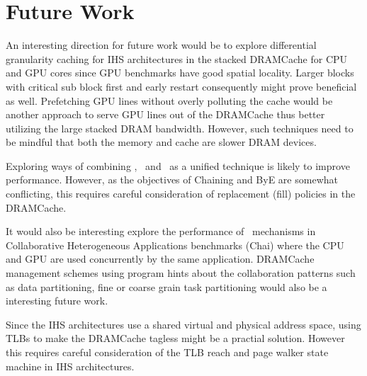 \section{Future Work}
An interesting direction for future work would be to explore differential granularity caching for IHS architectures in the stacked DRAMCache for CPU and GPU cores since GPU benchmarks have good spatial locality. Larger blocks with critical sub block first and early restart \cite{dram-book} consequently might prove beneficial as well. Prefetching GPU lines without overly polluting the cache would be another approach to serve GPU lines out of the DRAMCache thus better utilizing the large stacked DRAM bandwidth. However, such techniques need to be mindful that both the memory and cache are slower DRAM devices. 
\par Exploring ways of combining \prioname, \chaining\ and \bypassname\ as a unified technique is likely to improve performance. However, as the objectives of Chaining and ByE are somewhat conflicting, this requires careful consideration of replacement (fill) policies in the DRAMCache.
\par It would also be interesting explore the performance of \cachename\ mechanisms in Collaborative Heterogeneous Applications benchmarks (Chai) \cite{chai} where the CPU and GPU are used concurrently by the same application. DRAMCache management schemes using program hints about the collaboration patterns such as data partitioning, fine or coarse grain task partitioning would also be a interesting future work.
\par Since the IHS architectures use a shared virtual and physical address space, using TLBs to make the DRAMCache tagless might be a practial solution. However this requires careful consideration of the TLB reach and page walker state machine in IHS architectures.
